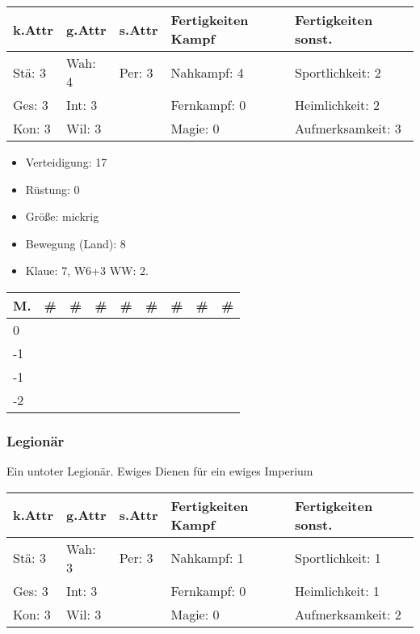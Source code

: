 \documentclass{article}
\begin{document}
\begin{small}
\begin{tabular}{|m{15mm}|m{15mm}|m{15mm}|m{35mm}|m{35mm}|}
\hline
\textbf{k.Attr}&\textbf{g.Attr}&\textbf{s.Attr}&\textbf{Fertigkeiten Kampf}&\textbf{Fertigkeiten sonst.}\\
\hline
\hline
Stä: 3&Wah: 4&Per: 3&Nahkampf: 4&Sportlichkeit: 2\\
\hline
Ges: 3&Int: 3& &Fernkampf: 0&Heimlichkeit: 2\\
\hline
Kon: 3&Wil: 3& &Magie: 0&Aufmerksamkeit: 3\\
\hline
\end{tabular}
\end{small}


\begin{itemize}
\item Verteidigung: 17
\item Rüstung:      0
\item Größe: mickrig
\item Bewegung (Land): 8
\item Klaue: 7, W6+3 WW: 2.
\end{itemize}


\begin{small}
\begin{tabular}{|m{6mm}|m{3mm}|m{3mm}|m{3mm}|m{3mm}|m{3mm}|m{3mm}|m{3mm}|m{3mm}|}
\hline
\textbf{M.}&\textbf{\#}&\textbf{\#}&\textbf{\#}&\textbf{\#}&\textbf{\#}&\textbf{\#}&\textbf{\#}&\textbf{\#}\\
\hline
\hline
0& & & & & & & & \\
\hline
-1& & & & & & & & \\
\hline
-1& & & & & & & & \\
\hline
-2& & & & & & & & \\
\hline
\end{tabular}
\end{small}

\subsubsection{Legionär}

Ein untoter Legionär. Ewiges Dienen für ein ewiges Imperium


\begin{small}
\begin{tabular}{|m{15mm}|m{15mm}|m{15mm}|m{35mm}|m{35mm}|}
\hline
\textbf{k.Attr}&\textbf{g.Attr}&\textbf{s.Attr}&\textbf{Fertigkeiten Kampf}&\textbf{Fertigkeiten sonst.}\\
\hline
\hline
Stä: 3&Wah: 3&Per: 3&Nahkampf: 1&Sportlichkeit: 1\\
\hline
Ges: 3&Int: 3& &Fernkampf: 0&Heimlichkeit: 1\\
\hline
Kon: 3&Wil: 3& &Magie: 0&Aufmerksamkeit: 2\\
\hline
\end{tabular}
\end{small}
\end{document}
